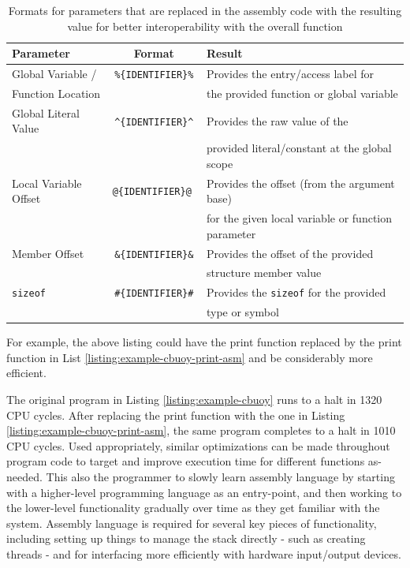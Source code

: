 \documentclass{article}
\begin{document}
\begin{table}[h!]
    \centering
    \begin{tabular}{l|cl}
        \hline
        Parameter & Format & Result \\
        \hline
        Global Variable / & \texttt{\%\{IDENTIFIER\}\%} & Provides the entry/access label for \\ Function Location & & the provided function or global variable \\
        Global Literal Value & \texttt{\textasciicircum\{IDENTIFIER\}\textasciicircum} & Provides the raw value of the \\ & & provided literal/constant at the global scope \\
        Local Variable Offset & \texttt{@\{IDENTIFIER\}@ } & Provides the offset (from the argument base) \\ & & for the given local variable or function parameter \\
        Member Offset & \texttt{\&\{IDENTIFIER\}\&} & Provides the offset of the provided \\ & & structure member value \\
        \texttt{sizeof} & \texttt{\#\{IDENTIFIER\}\#} & Provides the \texttt{sizeof} for the provided \\ & & type or symbol \\
        \hline
    \end{tabular}
    \caption{Formats for parameters that are replaced in the assembly code with the resulting value for better interoperability with the overall function}
    \label{table:cbuoy-assembly-mixin}
\end{table}

For example, the above listing could have the print function replaced by the print function in List \ref{listing:example-cbuoy-print-asm} and be considerably more efficient.



The original program in Listing \ref{listing:example-cbuoy} runs to a halt in 1320 CPU cycles. After replacing the print function with the one in Listing \ref{listing:example-cbuoy-print-asm}, the same program completes to a halt in 1010 CPU cycles. Used appropriately, similar optimizations can be made throughout program code to target and improve execution time for different functions as-needed. This also the programmer to slowly learn assembly language by starting with a higher-level programming language as an entry-point, and then working to the lower-level functionality gradually over time as they get familiar with the system. Assembly language is required for several key pieces of functionality, including setting up things to manage the stack directly - such as creating threads - and for interfacing more efficiently with hardware input/output devices.
\end{document}
